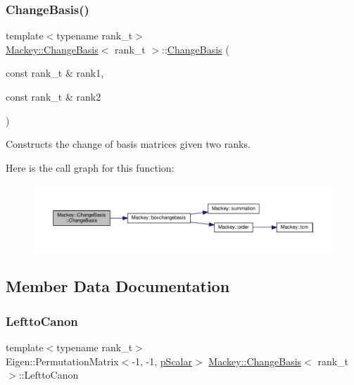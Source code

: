 \subsubsection{\texorpdfstring{Change\+Basis()}{ChangeBasis()}\hspace{0.1cm}{\footnotesize\ttfamily [2/2]}}
{\footnotesize\ttfamily template$<$typename rank\+\_\+t$>$ \\
\hyperlink{classMackey_1_1ChangeBasis}{Mackey\+::\+Change\+Basis}$<$ rank\+\_\+t $>$\+::\hyperlink{classMackey_1_1ChangeBasis}{Change\+Basis} (\begin{DoxyParamCaption}\item[{const rank\+\_\+t \&}]{rank1,  }\item[{const rank\+\_\+t \&}]{rank2 }\end{DoxyParamCaption})\hspace{0.3cm}{\ttfamily [inline]}}



Constructs the change of basis matrices given two ranks. 

Here is the call graph for this function\+:\nopagebreak
\begin{figure}[H]
\begin{center}
\leavevmode
\includegraphics[width=350pt]{classMackey_1_1ChangeBasis_a036c1f54ffb4cf4115efa2fab60c354b_cgraph}
\end{center}
\end{figure}


\subsection{Member Data Documentation}
\mbox{\label{classMackey_1_1ChangeBasis_aac6a5b932e7feea82c94447d541e6ded}} 
\subsubsection{\texorpdfstring{Leftto\+Canon}{LefttoCanon}}
{\footnotesize\ttfamily template$<$typename rank\+\_\+t$>$ \\
Eigen\+::\+Permutation\+Matrix$<$-\/1, -\/1, \hyperlink{namespaceMackey_a4f147e328c520f568f5d3adf1c75f514}{p\+Scalar}$>$ \hyperlink{classMackey_1_1ChangeBasis}{Mackey\+::\+Change\+Basis}$<$ rank\+\_\+t $>$\+::Leftto\+Canon}



